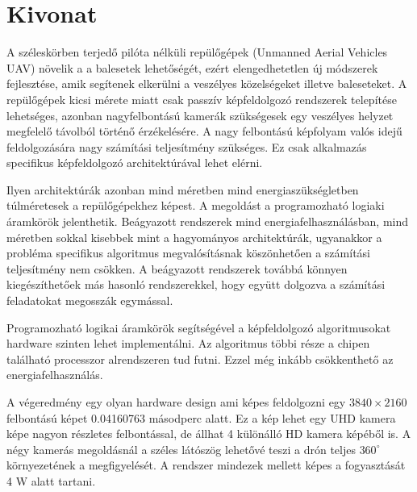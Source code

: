 \chapter*{Kivonat}
A széleskörben terjedő pilóta nélküli repülőgépek (Unmanned Aerial Vehicles UAV) növelik a a balesetek lehetőségét, ezért elengedhetetlen új módszerek fejlesztése, amik segítenek elkerülni a veszélyes közelségeket illetve baleseteket.
A repülőgépek kicsi mérete miatt csak passzív képfeldolgozó rendszerek telepítése lehetséges, azonban nagyfelbontású kamerák szükségesek egy veszélyes helyzet megfelelő távolból történő érzékelésére.
A nagy felbontású képfolyam valós idejű feldolgozására nagy számítási teljesítmény szükséges.
Ez csak alkalmazás specifikus képfeldolgozó architektúrával lehet elérni.

Ilyen architektúrák azonban mind méretben mind energiaszükségletben túlméretesek a repülőgépekhez képest.
A megoldást a programozható logiaki áramkörök jelenthetik.
Beágyazott rendszerek mind energiafelhasználásban, mind méretben sokkal kisebbek mint a hagyományos architektúrák, ugyanakkor a probléma specifikus algoritmus megvalósításnak köszönhetően a számítási teljesítmény nem csökken.
A beágyazott rendszerek továbbá könnyen kiegészíthetőek más hasonló rendszerekkel, hogy együtt dolgozva a számítási feladatokat megosszák egymással.

Programozható logikai áramkörök segítségével a képfeldolgozó algoritmusokat hardware szinten lehet implementálni.
Az algoritmus többi része a chipen található processzor alrendszeren tud futni.
Ezzel még inkább csökkenthető az energiafelhasználás.

A végeredmény egy olyan hardware design ami képes feldolgozni egy $3840 \times 2160$ felbontású képet 0.04160763 másodperc alatt.
Ez a kép lehet egy UHD kamera képe nagyon részletes felbontással, de állhat 4 különálló HD kamera képéből is.
A négy kamerás megoldásnál a széles látószög lehetővé teszi a drón teljes $360^\circ$ környezetének a megfigyelését.
A rendszer mindezek mellett képes a fogyasztását 4 W alatt tartani.


